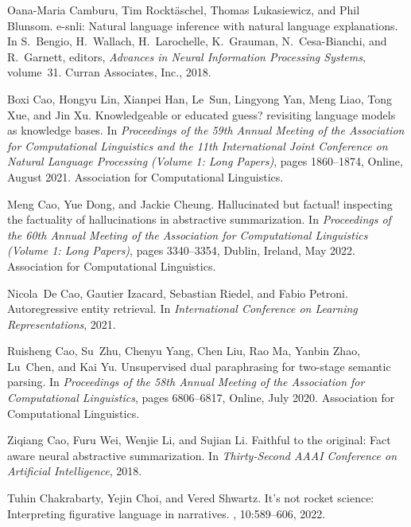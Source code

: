 \documentclass[11pt]{article}
\begin{document}
\begin{thebibliography}{100}
Oana-Maria Camburu, Tim Rockt\"{a}schel, Thomas Lukasiewicz, and Phil Blunsom.
\newblock e-snli: Natural language inference with natural language
  explanations.
\newblock In S.~Bengio, H.~Wallach, H.~Larochelle, K.~Grauman, N.~Cesa-Bianchi,
  and R.~Garnett, editors, {\em Advances in Neural Information Processing
  Systems}, volume~31. Curran Associates, Inc., 2018.

Boxi Cao, Hongyu Lin, Xianpei Han, Le~Sun, Lingyong Yan, Meng Liao, Tong Xue,
  and Jin Xu.
\newblock Knowledgeable or educated guess? revisiting language models as
  knowledge bases.
\newblock In {\em Proceedings of the 59th Annual Meeting of the Association for
  Computational Linguistics and the 11th International Joint Conference on
  Natural Language Processing (Volume 1: Long Papers)}, pages 1860--1874,
  Online, August 2021. Association for Computational Linguistics.

Meng Cao, Yue Dong, and Jackie Cheung.
\newblock Hallucinated but factual! inspecting the factuality of hallucinations
  in abstractive summarization.
\newblock In {\em Proceedings of the 60th Annual Meeting of the Association for
  Computational Linguistics (Volume 1: Long Papers)}, pages 3340--3354, Dublin,
  Ireland, May 2022. Association for Computational Linguistics.

Nicola~De Cao, Gautier Izacard, Sebastian Riedel, and Fabio Petroni.
\newblock Autoregressive entity retrieval.
\newblock In {\em International Conference on Learning Representations}, 2021.

Ruisheng Cao, Su~Zhu, Chenyu Yang, Chen Liu, Rao Ma, Yanbin Zhao, Lu~Chen, and
  Kai Yu.
\newblock Unsupervised dual paraphrasing for two-stage semantic parsing.
\newblock In {\em Proceedings of the 58th Annual Meeting of the Association for
  Computational Linguistics}, pages 6806--6817, Online, July 2020. Association
  for Computational Linguistics.

Ziqiang Cao, Furu Wei, Wenjie Li, and Sujian Li.
\newblock Faithful to the original: Fact aware neural abstractive
  summarization.
\newblock In {\em Thirty-Second AAAI Conference on Artificial Intelligence},
  2018.

Tuhin Chakrabarty, Yejin Choi, and Vered Shwartz.
\newblock It{'}s not rocket science: Interpreting figurative language in
  narratives.
,
  10:589--606, 2022.


\end{thebibliography}
\end{document}
